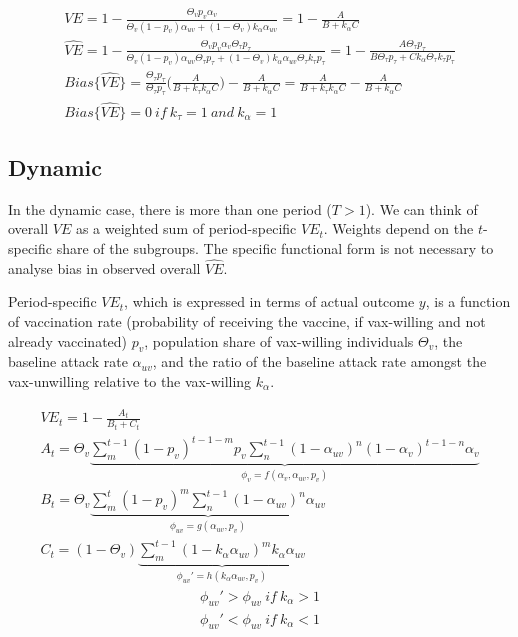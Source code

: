 \documentclass[12pt]{article}
\begin{document}
\begin{eqnarray}
	VE = 1 - \frac{\Theta_{v} p_{v} \alpha_{v} }{\Theta_{v} (1 - p_{v}) \alpha_{uv} + (1 - \Theta_{v}) k_{\alpha} \alpha_{uv}} = 1 - \frac{A}{B+ k_{\alpha} C} \\
	\widehat{VE} = 1 - \frac{\Theta_{v} p_{v} \alpha_{v} \Theta_{\tau} p_{\tau}}{\Theta_{v} (1 - p_{v}) \alpha_{uv} \Theta_{\tau} p_{\tau} + (1 - \Theta_{v}) k_{\alpha} \alpha_{uv} \Theta_{\tau} k_{\tau} p_{\tau}} = 1 - \frac{A\Theta_{\tau}p_{\tau}}{B\Theta_{\tau}p_{\tau}+ C k_{\alpha}\Theta_{\tau} k_{\tau}p_{\tau}} \\
	{Bias}\{\widehat{VE}\} = \frac{\Theta_{\tau} p_{\tau}}{\Theta_{\tau} p_{\tau}}\Big(\frac{A}{B + k_\tau k_\alpha C}\Big) - \frac{A}{B + k_\alpha C} = \frac{A}{B + k_\tau k_\alpha C} - \frac{A}{B + k_\alpha C} \\
	{Bias}\{\widehat{VE}\} = 0 \ if \ k_\tau = 1 \ and \ k_\alpha = 1
\end{eqnarray}

\subsection{Dynamic}
In the dynamic case, there is more than one period ($T > 1$). We can think of overall $VE$ as a weighted sum of period-specific ${VE}_{t}$. Weights depend on the $t$-specific share of the subgroups. The specific functional form is not necessary to analyse bias in observed overall $\widehat{VE}$.

Period-specific ${VE}_{t}$, which is expressed in terms of actual outcome $y$, is a function of vaccination rate (probability of receiving the vaccine, if vax-willing and not already vaccinated) $p_v$, population share of vax-willing individuals $\Theta_{v}$, the baseline attack rate $\alpha_{uv}$, and the ratio of the baseline attack rate amongst the vax-unwilling relative to the vax-willing $k_\alpha$.

\begin{eqnarray}
	VE_{t} = 1 - \frac{A_t}{B_t+C_t} \\
	A_t = \Theta_{v} \underbrace{\sum_{m}^{t-1} (1-p_v)^{t-1-m} p_v \sum_{n}^{t-1}(1-\alpha_{uv})^{n}(1-\alpha_{v})^{t-1-n}\alpha_{v}}_{\phi_v = f(\alpha_{v},\alpha_{uv},p_{v})} \\
	B_t = \Theta_{v} \underbrace{\sum_{m}^{t} (1-p_v)^{m} \sum_{n}^{t-1} (1-\alpha_{uv})^{n}\alpha_{uv}}_{\phi_{uv} = g(\alpha_{uv},p_{v})}  \\
	C_t = (1-\Theta_{v}) \underbrace{\sum_{m}^{t-1} (1- k_\alpha \alpha_{uv})^{m} k_\alpha \alpha_{uv}}_{\phi_{uv}' = h(k_\alpha \alpha_{uv},p_{v})}
\end{eqnarray}
\begin{eqnarray}
	\phi_{uv}' > \phi_{uv} \ if \  k_\alpha > 1 \\
	\phi_{uv}' < \phi_{uv} \ if \ k_\alpha < 1
\end{eqnarray}
\end{document}
